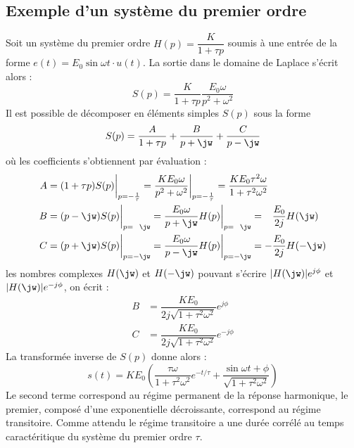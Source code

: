 \subsection{Exemple d'un système du premier ordre}
Soit un système du premier ordre $H(p)=\dfrac{K}{1+\tau p}$ soumis à une entrée
de la forme $e(t)=E_0\sin\omega t\cdot u(t)$. La sortie dans le domaine de
Laplace s'écrit alors :
\[
    S(p)=\dfrac{K}{1+\tau p}\dfrac{E_0\omega}{p^2+\omega^2}
\]
Il est possible de décomposer en éléments simples $S(p)$ sous la forme  
\[
    S(p)=\dfrac{A}{1+\tau p}+\dfrac{B}{p+\jw}+\dfrac{C}{p-\jw}
\]
où les coefficients s'obtiennent par évaluation :
\begin{align*}
    A&=(1+\tau p)S(p)\bigg|_{p=-\frac{1}{\tau}}=
       \dfrac{KE_0\omega}{p^2+\omega^2}\bigg|_{p=-\frac{1}{\tau}}=
       \dfrac{KE_0\tau^2\omega}{1+\tau^2\omega^2}\\
    B&=(p-\jw)S(p)\bigg|_{p=\hphantom{-}\jw}=
       \dfrac{E_0\omega}{p+\jw}H(p)\bigg|_{p=\hphantom{-}\jw}=
       \hphantom{-}\dfrac{E_0}{2j}H(\jw)\\
    C&=(p+\jw)S(p)\bigg|_{p=-\jw}=
       \dfrac{E_0\omega}{p-\jw}H(p)\bigg|_{p=-\jw}=
       -\dfrac{E_0}{2j}H(-\jw)
\end{align*}
les nombres complexes $H(\jw)$ et $H(-\jw)$ pouvant s'écrire 
$|H(\jw)|e^{j\phi}$ et $|H(\jw)|e^{-j\phi}$, on écrit :
\begin{align*}
    B &= \dfrac{KE_0}{2j\sqrt{1+\tau^2\omega^2}}e^{j\phi} \\
    C &= \dfrac{KE_0}{2j\sqrt{1+\tau^2\omega^2}}e^{-j\phi}
\end{align*}
La transformée inverse de $S(p)$ donne alors :
\[
    s(t)= KE_0\left( \dfrac{\tau\omega}{1+\tau^2\omega^2} e^{-t/\tau}
       + \dfrac{\sin{\omega t +\phi}}{\sqrt{1+\tau^2\omega^2}}\right)
\]
Le second terme correspond au régime permanent de la réponse harmonique,
le premier, composé d'une exponentielle décroissante, correspond au régime 
transitoire. Comme attendu le régime transitoire a une durée corrélé au temps
caractéritique du système du premier ordre $\tau$.
